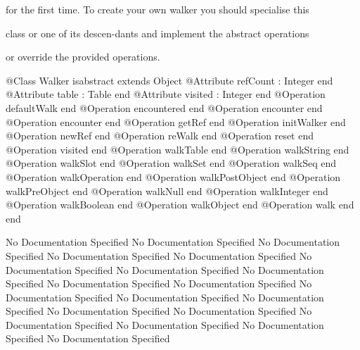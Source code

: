       for the first time. To create your own walker you should specialise this

      class or one of its descen-dants and implement the abstract operations

      or override the provided operations.
\begin{Interface}
@Class Walker isabstract extends Object
  @Attribute refCount : Integer end
  @Attribute table : Table end
  @Attribute visited : Integer end
  @Operation defaultWalk end
  @Operation encountered end
  @Operation encounter end
  @Operation encounter end
  @Operation getRef end
  @Operation initWalker end
  @Operation newRef end
  @Operation reWalk end
  @Operation reset end
  @Operation visited end
  @Operation walkTable end
  @Operation walkString end
  @Operation walkSlot end
  @Operation walkSet end
  @Operation walkSeq end
  @Operation walkOperation end
  @Operation walkPostObject end
  @Operation walkPreObject end
  @Operation walkNull end
  @Operation walkInteger end
  @Operation walkBoolean end
  @Operation walkObject end
  @Operation walk end
end
\end{Interface}
No Documentation Specified
No Documentation Specified
No Documentation Specified
No Documentation Specified
No Documentation Specified
No Documentation Specified
No Documentation Specified
No Documentation Specified
No Documentation Specified
No Documentation Specified
No Documentation Specified
No Documentation Specified
No Documentation Specified
No Documentation Specified
No Documentation Specified
No Documentation Specified
No Documentation Specified
No Documentation Specified
No Documentation Specified
